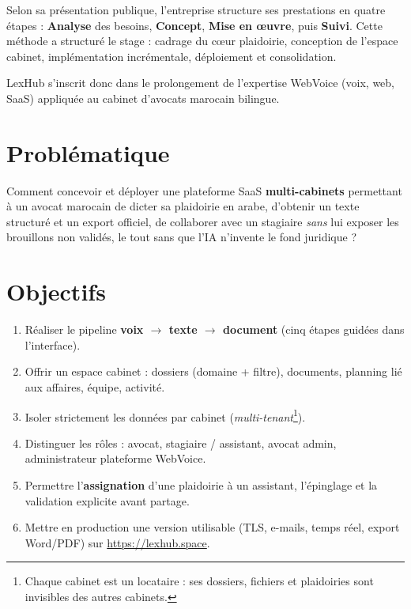 Selon sa présentation publique, l'entreprise structure ses prestations en quatre étapes : \textbf{Analyse} des besoins, \textbf{Concept}, \textbf{Mise en œuvre}, puis \textbf{Suivi}. Cette méthode a structuré le stage : cadrage du cœur plaidoirie, conception de l'espace cabinet, implémentation incrémentale, déploiement et consolidation.

LexHub s'inscrit donc dans le prolongement de l'expertise WebVoice (voix, web, SaaS) appliquée au cabinet d'avocats marocain bilingue.

\section{Problématique}

Comment concevoir et déployer une plateforme SaaS \textbf{multi-cabinets} permettant à un avocat marocain de dicter sa plaidoirie en arabe, d'obtenir un texte structuré et un export officiel, de collaborer avec un stagiaire \emph{sans} lui exposer les brouillons non validés, le tout sans que l'IA n'invente le fond juridique ?

\section{Objectifs}

\begin{enumerate}[label=\textbf{O\arabic*.}]
  \item Réaliser le pipeline \textbf{voix $\rightarrow$ texte $\rightarrow$ document} (cinq étapes guidées dans l'interface).
  \item Offrir un espace cabinet : dossiers (domaine + filtre), documents, planning lié aux affaires, équipe, activité.
  \item Isoler strictement les données par cabinet (\textit{multi-tenant}\footnote{Chaque cabinet est un locataire : ses dossiers, fichiers et plaidoiries sont invisibles des autres cabinets.}).
  \item Distinguer les rôles : avocat, stagiaire / assistant, avocat admin, administrateur plateforme WebVoice.
  \item Permettre l'\textbf{assignation} d'une plaidoirie à un assistant, l'épinglage et la validation explicite avant partage.
  \item Mettre en production une version utilisable (TLS, e-mails, temps réel, export Word/PDF) sur \url{https://lexhub.space}.
\end{enumerate}

